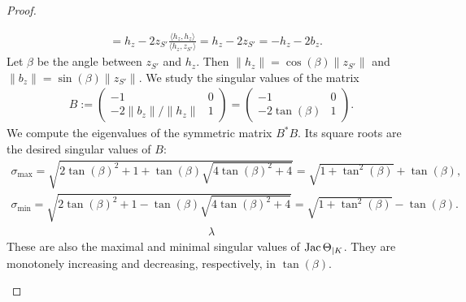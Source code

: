 \documentclass[10pt,letterpaper]{article}
\begin{document}
\begin{proof}
\begin{itemize}
\begin{align*}
            &= 
            h_z
            - 
            2 z_{S'} \frac{\langle h_z, h_z \rangle}{\langle h_z, z_{S'} \rangle}
            = 
            h_z
            - 
            2 z_{S'}
            = 
            - h_{z}
            - 
            2 b_{z}
            .
        \end{align*}
        Let $\beta$ be the angle between $z_{S'}$ and $h_{z}$. 
        Then $\| h_z \| = \cos(\beta) \|z_{S'}\|$ and $\| b_z \| = \sin(\beta) \|z_{S'}\|$. 
        We study the singular values of the matrix 
        \begin{align*}
            B 
            := 
            \begin{pmatrix}
            -1                 & 0
            \\ 
            -2 \|b_z\|/\|h_z\| & 1
            \end{pmatrix}
            =
            \begin{pmatrix}
            -1             & 0
            \\ 
            -2 \tan(\beta) & 1
            \end{pmatrix}
            .
        \end{align*}
        We compute the eigenvalues of the symmetric matrix $B^{\ast} B$. 
        Its square roots are the desired singular values of $B$:
        \begin{align*}
            \sigma_{\max} = \sqrt{ 2\tan(\beta)^2 + 1 + \tan(\beta) \sqrt{ 4\tan(\beta)^2 + 4 } } = \sqrt{ 1 + \tan^{2}(\beta) } + \tan(\beta)
            ,
            \\
            \sigma_{\min} = \sqrt{ 2\tan(\beta)^2 + 1 - \tan(\beta) \sqrt{ 4\tan(\beta)^2 + 4 } } = \sqrt{ 1 + \tan^{2}(\beta) } - \tan(\beta)
            .
        \end{align*}
        \begin{align*}
            \lambda
        \end{align*}
        These are also the maximal and minimal singular values of $\operatorname{{\rm Jac}}\Theta_{|K}$. 
        They are monotonely increasing and decreasing, respectively, in $\tan(\beta)$. 
        

\end{itemize}
\end{proof}
\end{document}
